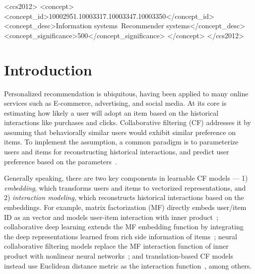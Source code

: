 \documentclass[sigconf]{acmart}
\theoremstyle{definition}
\begin{document}

\begin{CCSXML}
	<ccs2012>
	<concept>
	<concept_id>10002951.10003317.10003347.10003350</concept_id>
	<concept_desc>Information systems~Recommender systems</concept_desc> <concept_significance>500</concept_significance>
	</concept>
	</ccs2012>
\end{CCSXML}

\vspace{-5pt}
\maketitle


\section{Introduction}
Personalized recommendation is ubiquitous, having been applied to many online services such as E-commerce, advertising, and social media.
At its core is estimating how likely a user will adopt an item based on the historical interactions like purchases and clicks.
Collaborative filtering (CF) addresses it by assuming that behaviorally similar users would exhibit similar preference on items. 
To implement the assumption, a common paradigm is to parameterize users and items for reconstructing historical interactions, and predict user preference based on the parameters~\cite{NCF,KTUP}.

Generally speaking, there are two key components in learnable CF models --- 1) \emph{embedding}, which transforms users and items to vectorized representations, and 2) \emph{interaction modeling}, which reconstructs historical interactions based on the embeddings.
For example, matrix factorization (MF) directly embeds user/item ID as an vector and models user-item interaction with inner product~\cite{MF}; collaborative deep learning extends the MF embedding function by integrating the deep representations learned from rich side information of items~\cite{CDL}; 
neural collaborative filtering models replace the MF interaction function of inner product with nonlinear neural networks~\cite{NCF}; and translation-based CF models instead use Euclidean distance metric as the
interaction function~\cite{tay2018latent}, among others.
\end{document}

